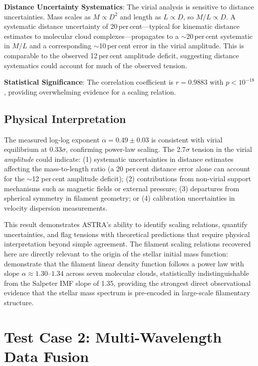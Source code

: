 \documentclass[usenatbib]{rasti}
\begin{document}
\textbf{Distance Uncertainty Systematics}: The virial analysis is sensitive to distance uncertainties. Mass scales as $M \propto D^2$ and length as $L \propto D$, so $M/L \propto D$. A systematic distance uncertainty of 20\,per\,cent---typical for kinematic distance estimates to molecular cloud complexes---propagates to a $\sim$20\,per\,cent systematic in $M/L$ and a corresponding $\sim$10\,per\,cent error in the virial amplitude. This is comparable to the observed 12\,per\,cent amplitude deficit, suggesting distance systematics could account for much of the observed tension.

\textbf{Statistical Significance}: The correlation coefficient is $r = 0.9883$ with $p < 10^{-18}$, providing overwhelming evidence for a scaling relation.

\subsection{Physical Interpretation}

The measured log-log exponent $\alpha = 0.49 \pm 0.03$ is consistent with virial equilibrium at $0.33\sigma$, confirming power-law scaling. The 2.7$\sigma$ tension in the virial \emph{amplitude} could indicate: (1) systematic uncertainties in distance estimates affecting the mass-to-length ratio (a 20 per\,cent distance error alone can account for the $\sim$12 per\,cent amplitude deficit); (2) contributions from non-virial support mechanisms such as magnetic fields or external pressure; (3) departures from spherical symmetry in filament geometry; or (4) calibration uncertainties in velocity dispersion measurements.


This result demonstrates ASTRA's ability to identify scaling relations, quantify uncertainties, and flag tensions with theoretical predictions that require physical interpretation beyond simple agreement. The filament scaling relations recovered here are directly relevant to the origin of the stellar initial mass function: \citet{zhang2026fldf} demonstrate that the filament linear density function follows a power law with slope $\alpha \approx 1.30$--$1.34$ across seven molecular clouds, statistically indistinguishable from the Salpeter IMF slope of 1.35, providing the strongest direct observational evidence that the stellar mass spectrum is pre-encoded in large-scale filamentary structure.

\section{Test Case 2: Multi-Wavelength Data Fusion}
\end{document}
